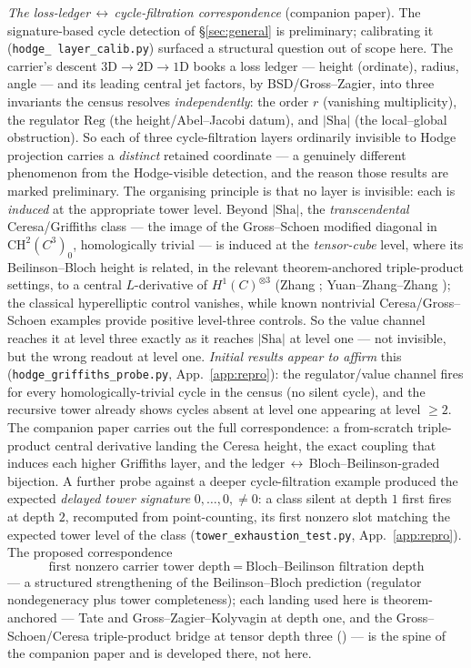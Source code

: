 \documentclass[11pt]{article}
\theoremstyle{definition}
\newcommand{\Sha}{\mathrm{Sha}}
\begin{document}
\emph{The loss-ledger$\,\leftrightarrow\,$cycle-filtration correspondence} (companion paper). The
signature-based cycle detection of \S\ref{sec:general} is preliminary; calibrating it (\texttt{hodge\_%
layer\_calib.py}) surfaced a structural question out of scope here. The carrier's descent
$3\mathrm D\!\to\!2\mathrm D\!\to\!1\mathrm D$ books a loss ledger --- height (ordinate), radius, angle ---
and its leading central jet factors, by BSD/Gross--Zagier, into three invariants the census resolves
\emph{independently}: the order $r$ (vanishing multiplicity), the regulator $\mathrm{Reg}$ (the
height/Abel--Jacobi datum), and $|\Sha|$ (the local--global obstruction). So each of three
cycle-filtration layers ordinarily invisible to Hodge projection carries a \emph{distinct} retained
coordinate --- a genuinely different phenomenon from the Hodge-visible detection, and the reason those
results are marked preliminary. The organising principle is that no layer is invisible: each is
\emph{induced} at the appropriate tower level. Beyond $|\Sha|$, the \emph{transcendental} Ceresa/Griffiths
class --- the image of the Gross--Schoen modified diagonal in $\mathrm{CH}^2(C^3)_0$, homologically
trivial --- is induced at the \emph{tensor-cube} level, where its Beilinson--Bloch height is related, in
the relevant theorem-anchored triple-product settings, to a central $L$-derivative of $H^1(C)^{\otimes3}$
(Zhang \cite{ZhangGS}; Yuan--Zhang--Zhang \cite{YZZ}); the classical hyperelliptic control vanishes, while
known nontrivial Ceresa/Gross--Schoen examples provide positive level-three controls. So the value channel
reaches it at level three exactly as it reaches $|\Sha|$ at level
one --- not invisible, but the wrong readout at level one. \emph{Initial results appear to affirm} this
(\texttt{hodge\_griffiths\_probe.py}, App.~\ref{app:repro}): the regulator/value channel fires for every
homologically-trivial cycle in the census (no silent cycle), and the recursive tower already shows cycles
absent at level one appearing at level $\ge2$. The companion paper carries out the full correspondence: a
from-scratch triple-product central derivative landing the Ceresa height, the exact coupling that induces
each higher Griffiths layer, and the ledger$\,\leftrightarrow\,$Bloch--Beilinson-graded bijection. A
further probe against a deeper cycle-filtration example produced the expected \emph{delayed tower
signature} $0,\dots,0,\neq0$: a class silent at depth $1$ first fires at depth $2$, recomputed from
point-counting, its first nonzero slot matching the expected tower level of the class
(\texttt{tower\_exhaustion\_test.py}, App.~\ref{app:repro}). The proposed correspondence
\[
  \boxed{\ \text{first nonzero carrier tower depth}\ =\ \text{Bloch--Beilinson filtration depth}\ }
\]
--- a structured strengthening of the Beilinson--Bloch prediction (regulator
nondegeneracy plus tower completeness); each landing used here is theorem-anchored --- Tate and
Gross--Zagier--Kolyvagin at depth one, and the Gross--Schoen/Ceresa triple-product bridge at tensor depth
three (\cite{ZhangGS,YZZ}) --- is the
spine of the companion paper and is developed there, not here.
\end{document}
